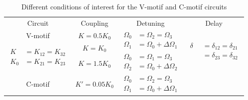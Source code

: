 \documentclass[../main.tex]{subfiles}
\begin{document}
\begin{table}[h]
\caption{Different conditions of interest for the V-motif and C-motif circuits}
\begin{tabular}{|c|c|c|c|}
\hline
\multirow{2}{3cm}{\centering Circuit}  & \multirow{2}{2.5cm}{\centering Coupling}  & \multirow{2}{2.5cm}{\centering Detuning} & \multirow{2}{3cm}{\centering Delay} \\
& & & \\
\hline
    \multirow{2}{2cm}{\centering V-motif}
    &   
    \multirow{2}{2.5cm}{\centering$K=0.5K_0$}
    &
    \multirow{3}{3cm}{\centering
    $\begin{aligned}
    \Omega_0 &= \Omega_2 = \Omega_3 \\
    \Omega_1 &= \Omega_0 + \Delta\Omega_1
    \end{aligned}$}
    &
    \multirow{6}{3cm}{\centering
    $\begin{aligned}
        \delta &= \delta_{12} = \delta_{21} \\
        \quad  &= \delta_{23} = \delta_{32} 
    \end{aligned}$ }
    \\ 
    & & & 
    \\
    \cline{2-2}
    \multirow{4}{3cm}{\centering
    $\begin{aligned}
        K &= K_{12}=K_{32}\\
        K_0 &=K_{21}=K_{23}
    \end{aligned}$
    }
    &  
    \multirow{2}{2.5cm}{\centering $K= K_0$}
    & & 
    \\
    & &  
    \multirow{3}{3cm}{\centering
    $\begin{aligned}
    \Omega_0 &= \Omega_1 = \Omega_3 \\
    \Omega_2 &= \Omega_0 + \Delta\Omega_2
    \end{aligned}$
    }
    & 
    \\
    \cline{2-2}
    & \multirow{2}{2.5cm}{\centering $K=1.5 K_0$} & & 
    \\    
    & & &  
    \\
\hline    
    \multirow{3}{3cm}{\centering C-motif}
    &   
    \multirow{2}{2.5cm}{\centering $K'= 0.05K_0$}
    &
    \multirow{4}{3cm}{\centering
    $\begin{aligned}
    \Omega_0 &= \Omega_2 = \Omega_3 \\
    \Omega_1 &= \Omega_0 + \Delta\Omega_1
    \end{aligned}$}

\end{tabular}
\end{table}
\end{document}

